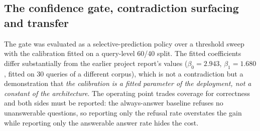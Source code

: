 \documentclass[conference]{IEEEtran}
\begin{document}
\begin{table}[t]
\caption{Retrieval ablation on {{N_FOCUS_QUERIES}} silver-standard queries over the
{{N_FOCUS_CHUNKS_TEX}}-chunk focus-domain corpus. $\Delta$R@10 is the paired Wilcoxon signed-rank
difference to the preceding rung.}
\label{tab:ablation}
\centering
\small
{}
\end{table}


\subsection{The confidence gate, contradiction surfacing and transfer}
The gate was evaluated as a selective-prediction policy over a threshold
sweep with the calibration fitted on a query-level 60/40 split. The fitted
coefficients differ substantially from the earlier project report's values
($\beta_0=2.943$, $\beta_1=1.680$, fitted on 30 queries of a different
corpus), which is not a contradiction but a demonstration that \emph{the
calibration is a fitted parameter of the deployment, not a constant of the
architecture}. The operating point trades coverage for correctness and both
sides must be reported: the always-answer baseline refuses no unanswerable
questions, so reporting only the refusal rate overstates the gain while
reporting only the answerable answer rate hides the cost.
\end{document}
